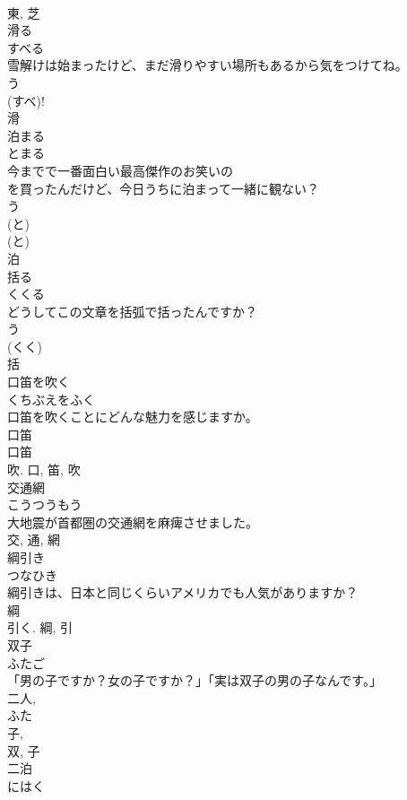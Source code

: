 \documentclass[8pt]{extreport}
\begin{document}
\begin{CJK}{UTF8}{min}
\\	東, 芝	
\\	滑る	
\\	すべる	
\\	雪解けは始まったけど、まだ滑りやすい場所もあるから気をつけてね。	
\\	う 
\\	(すべ)! 
\\	滑	
\\	泊まる	
\\	とまる	
\\	今までで一番面白い最高傑作のお笑いの
\\	を買ったんだけど、今日うちに泊まって一緒に観ない？	
\\	う 
\\	(と) 
\\	(と) 
\\	泊	
\\	括る	
\\	くくる	
\\	どうしてこの文章を括弧で括ったんですか？	
\\	う 
\\	(くく) 
\\	括	
\\	口笛を吹く	
\\	くちぶえをふく	
\\	口笛を吹くことにどんな魅力を感じますか。	
\\	口笛 
\\	口笛 
\\	吹.	口, 笛, 吹	
\\	交通網	
\\	こうつうもう	
\\	大地震が首都圏の交通網を麻痺させました。	
\\	交, 通, 網	
\\	綱引き	
\\	つなひき	
\\	綱引きは、日本と同じくらいアメリカでも人気がありますか？	
\\	綱 
\\	引く.	綱, 引	
\\	双子	
\\	ふたご	
\\	「男の子ですか？女の子ですか？」「実は双子の男の子なんです。」	
\\	二人, 
\\	ふた 
\\	子, 
\\	双, 子	
\\	二泊	
\\	にはく	

\end{CJK}
\end{document}
